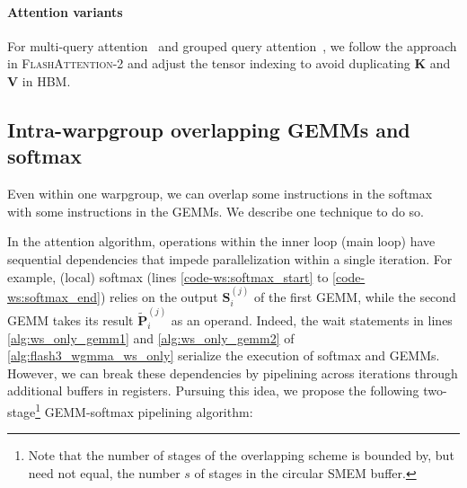\paragraph{Attention variants} For multi-query attention~\citep{shazeer2019fast} and grouped query attention~\citep{ainslie2023gqa}, we follow the approach in \textsc{FlashAttention-2} and adjust the tensor indexing to avoid duplicating $\mathbf{K}$ and $\mathbf{V}$ in HBM.

\subsection{Intra-warpgroup overlapping GEMMs and softmax}

Even within one warpgroup, we can overlap some instructions in the softmax with some instructions in the GEMMs. We describe one technique to do so.

In the attention algorithm, operations within the inner loop (main loop) have sequential dependencies that impede parallelization within a single iteration. For example, (local) softmax (lines \ref{code-ws:softmax_start} to \ref{code-ws:softmax_end}) relies on the output $\mathbf{S}_i^{(j)}$ of the first GEMM, while the second GEMM takes its result $\widetilde{\mathbf{P}}_i^{(j)}$ as an operand. Indeed, the wait statements in lines \ref{alg:ws_only_gemm1} and \ref{alg:ws_only_gemm2} of \cref{alg:flash3_wgmma_ws_only} serialize the execution of softmax and GEMMs. However, we can break these dependencies by pipelining across iterations through additional buffers in registers. Pursuing this idea, we propose the following two-stage\footnote{Note that the number of stages of the overlapping scheme is bounded by, but need not equal, the number $s$ of stages in the circular SMEM buffer.} GEMM-softmax pipelining algorithm:


